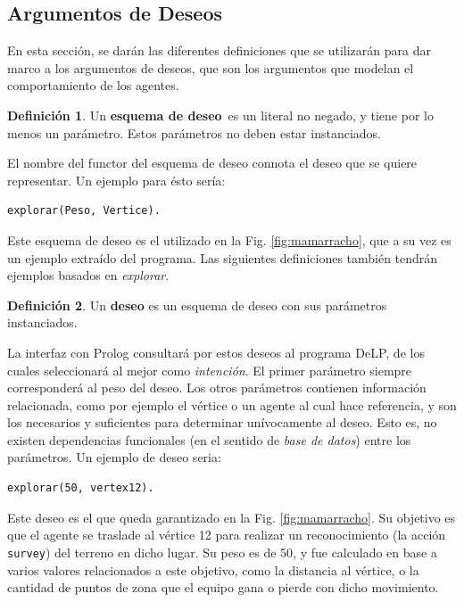 \documentclass[oneside]{book}
\theoremstyle{definition}
\newtheorem{definicion}{Definición}[section]
\theoremstyle{example}
\begin{document}
\subsection{Argumentos de Deseos}

\label{sec:argumentosDeseos}

En esta sección, se darán las diferentes definiciones que se utilizarán para dar marco a los
argumentos de deseos, que son los argumentos que modelan el comportamiento de los agentes.

\begin{definicion}
	Un \textbf{esquema de deseo}\ es un literal no negado, 
	y tiene por lo menos un parámetro. Estos parámetros
	no deben estar instanciados.
\end{definicion}


El nombre del functor del esquema de deseo connota el deseo que se quiere 
representar. Un ejemplo para ésto sería:

\begin{verbatim}
explorar(Peso, Vertice).
\end{verbatim}

Este esquema de deseo es el utilizado en la Fig. \ref{fig:mamarracho}, que a 
su vez es un ejemplo extraído del programa. Las siguientes definiciones también
tendrán ejemplos basados en \textit{explorar}.


\begin{definicion}
	Un \textbf{deseo} es un esquema de deseo con sus parámetros instanciados.
\end{definicion}

La interfaz con Prolog consultará por estos deseos al programa DeLP, de los 
cuales seleccionará al mejor como \emph{intención}. El primer parámetro 
siempre corresponderá al peso del deseo. Los otros parámetros contienen 
información relacionada, como por ejemplo el vértice o un agente al cual hace 
referencia, y son los necesarios y suficientes para determinar unívocamente al
deseo. Esto es, no existen dependencias funcionales (en el sentido de 
\emph{base de datos}) entre los parámetros. Un ejemplo de deseo seria:

\begin{verbatim}
explorar(50, vertex12).
\end{verbatim}

Este deseo es el que queda garantizado en la Fig. \ref{fig:mamarracho}. Su 
objetivo es que el agente se traslade al vértice 12 para 
realizar un reconocimiento (la acción \texttt{survey}) del terreno en dicho
lugar. Su peso es de 50, y fue calculado en base a varios valores relacionados
a este objetivo, como la distancia al vértice, o la cantidad de puntos de zona
que el equipo gana o pierde con dicho movimiento.
\end{document}

